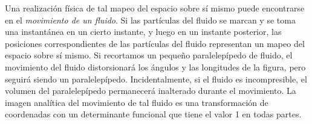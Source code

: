 \documentclass[12pt,a4paper]{book}
\begin{document}
Una realizaci\'on f\'isica de tal mapeo del espacio sobre s\'i mismo puede encontrarse en el \textit{movimiento de un fluido}. Si las part\'iculas del fluido se marcan y se toma una instant\'anea en un cierto instante, y luego en un instante posterior, las posiciones correspondientes de las part\'iculas del fluido representan un mapeo del espacio sobre s\'i mismo. Si recortamos un peque\~no paralelep\'ipedo de fluido, el movimiento del fluido distorsionar\'a los \'angulos y las longitudes de la figura, pero seguir\'a siendo un paralelep\'ipedo. Incidentalmente, si el fluido es incompresible, el volumen del paralelep\'ipedo permanecer\'a inalterado durante el movimiento. La imagen anal\'itica del movimiento de tal fluido es una transformaci\'on de coordenadas con un determinante funcional que tiene el valor 1 en todas partes.
\end{document}

